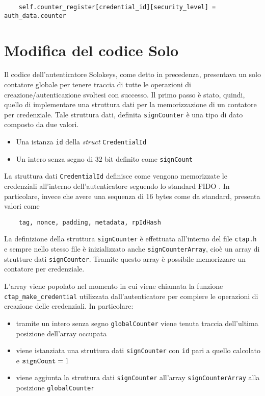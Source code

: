 \begin{verbatim}
	self.counter_register[credential_id][security_level] = auth_data.counter
\end{verbatim}

\section{Modifica del codice Solo}
\label{modifica_solo}

Il codice dell'autenticatore Solokeys, come detto in precedenza, presentava un solo contatore globale per tenere traccia di tutte le operazioni di creazione/autenticazione svoltesi con successo. Il primo passo è stato, quindi, quello di implementare una struttura dati per la memorizzazione di un contatore per credenziale. Tale struttura dati, definita \verb*|signCounter| è una tipo di dato composto da due valori.
\begin{itemize}
	\item Una istanza \verb*|id| della \emph{struct} \verb*|CredentialId|
	\item Un intero senza segno di 32 bit definito come \verb*|signCount|
\end{itemize}

La struttura dati \verb*|CredentialId| definisce come vengono memorizzate le credenziali all'interno dell'autenticatore seguendo lo standard FIDO \cite{fido:credential_id}. In particolare, invece che avere una sequenza di 16 bytes come da standard, presenta valori come \begin{verbatim}
	tag, nonce, padding, metadata, rpIdHash
\end{verbatim} 

La definizione della struttura \verb*|signCounter| è effettuata all'interno del file \verb*|ctap.h| e sempre nello stesso file è inizializzato anche \verb*|signCounterArray|, cioè un array di strutture dati \verb*|signCounter|. Tramite questo array è possibile memorizzare un contatore per credenziale. 

L'array viene popolato nel momento in cui viene chiamata la funzione \verb*|ctap_make_credential| utilizzata dall'autenticatore per compiere le operazioni di creazione delle credenziali. In particolare:
\begin{itemize}
	\item tramite un intero senza segno \verb*|globalCounter| viene tenuta traccia dell'ultima posizione dell'array occupata
	\item viene istanziata una struttura dati \verb*|signCounter| con \verb*|id| pari a quello calcolato e $\verb*|signCount| = 1 $
	\item viene aggiunta la struttura dati \verb*|signCounter| all'array \verb*|signCounterArray| alla posizione \verb*|globalCounter|
\end{itemize}

